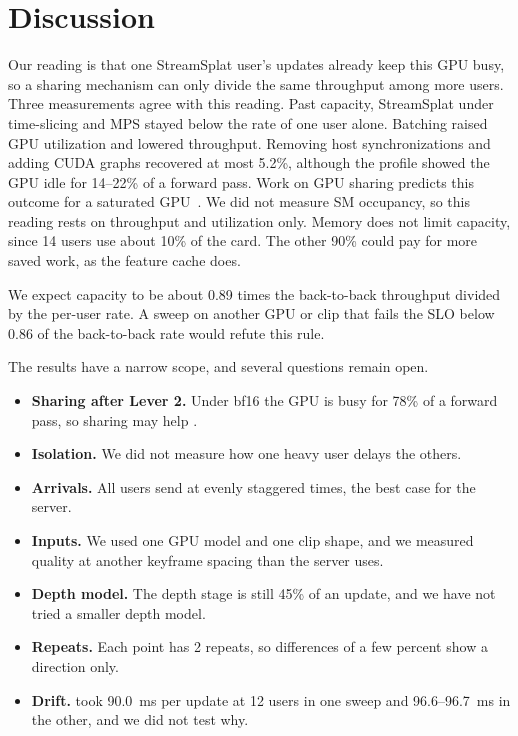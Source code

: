 \section{Discussion}
\label{sec:discussion}

Our reading is that one StreamSplat user's updates already keep this GPU busy, so a sharing mechanism can only divide the same throughput among more users.
Three measurements agree with this reading.
Past capacity, StreamSplat under time-slicing and MPS stayed below the rate of one user alone. %
Batching raised GPU utilization and lowered throughput. %
Removing host synchronizations and adding CUDA graphs recovered at most 5.2\%, although the profile showed the GPU idle for 14--22\% of a forward pass. %
Work on GPU sharing predicts this outcome for a saturated GPU~\cite{nvidia_mps,gilman2021,clockwork2020,alpaserve2023}.
We did not measure SM occupancy, so this reading rests on throughput and utilization only.
Memory does not limit capacity, since 14 users use about 10\% of the card. %
The other 90\% could pay for more saved work, as the feature cache does.

We expect capacity to be about 0.89 times the back-to-back throughput divided by the per-user rate. %
A sweep on another GPU or clip that fails the SLO below 0.86 of the back-to-back rate would refute this rule. %

The results have a narrow scope, and several questions remain open.
\begin{itemize}
\item \textbf{Sharing after Lever 2.} Under bf16 the GPU is busy for 78\% of a forward pass, so sharing may help \optd{}. %
\item \textbf{Isolation.} We did not measure how one heavy user delays the others.
\item \textbf{Arrivals.} All users send at evenly staggered times, the best case for the server.
\item \textbf{Inputs.} We used one GPU model and one clip shape, and we measured quality at another keyframe spacing than the server uses.
\item \textbf{Depth model.} The depth stage is still 45\% of an update, and we have not tried a smaller depth model. %
\item \textbf{Repeats.} Each point has 2 repeats, so differences of a few percent show a direction only. %
\item \textbf{Drift.} \opt{} took 90.0~ms per update at 12 users in one sweep and 96.6--96.7~ms in the other, and we did not test why. %
\end{itemize}
